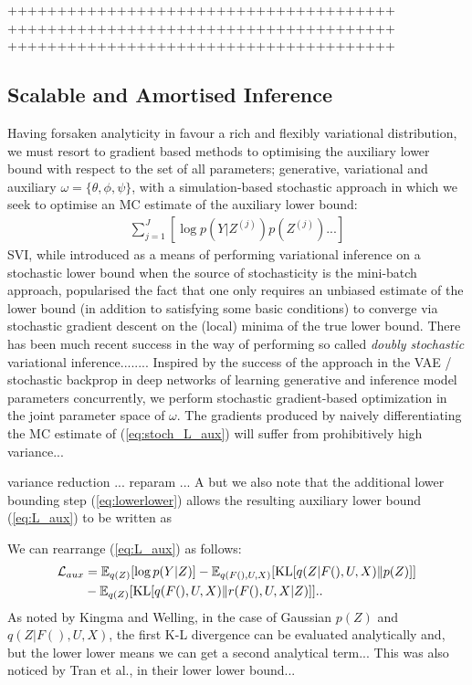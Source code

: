 \documentclass{article}
\begin{document}
+++++++++++++++++++++++++++++++++++++++
+++++++++++++++++++++++++++++++++++++++
+++++++++++++++++++++++++++++++++++++++

\subsection{Scalable and Amortised Inference}
\label{subsec:scale}

Having forsaken analyticity in favour a rich and flexibly variational distribution, we must resort to gradient based methods to optimising the auxiliary lower bound with respect to the set of all parameters; generative, variational and auxiliary $\omega=\{\theta,\phi,\psi\}$, with a simulation-based stochastic approach in which we seek to optimise an MC estimate of the auxiliary lower bound:
%
\begin{align}
  \sum_{j=1}^J [\log p(Y|Z^{(j)})p(Z^{(j)})...]\label{eq:stoch_L_aux}
\end{align}
%
SVI, while introduced as a means of performing variational inference on a stochastic lower bound when the source of stochasticity is the mini-batch approach, popularised the fact that one only requires an unbiased estimate of the lower bound (in addition to satisfying some basic conditions) to converge via stochastic gradient descent on the (local) minima of the true lower bound. There has been much recent success in the way of performing so called \emph{doubly stochastic} variational inference........
Inspired by the success of the approach in the VAE / stochastic backprop in deep networks of learning generative and inference model parameters concurrently, we perform stochastic gradient-based optimization in the joint parameter space of $\omega$. The gradients produced by naively differentiating the MC estimate of (\ref{eq:stoch_L_aux}) will suffer from prohibitively high variance...

variance reduction ... reparam ... A but we also note that the additional lower bounding step (\ref{eq:lowerlower}) allows the resulting auxiliary lower bound (\ref{eq:L_aux}) to be written as

We can rearrange (\ref{eq:L_aux}) as follows:
%
\begin{align}
  \mathcal{L}_{aux} &= \mathbb{E}_{q(Z)}[ \log p(Y|Z) ] - \mathbb{E}_{q(F(),U,X)}[ \text{KL}[q(Z|F(),U,X)\Vert p(Z)] ]\notag\\
  &- \mathbb{E}_{q(Z)}[ \text{KL}[q(F(),U,X)\Vert r(F(),U,X|Z)] ].\label{eq:L_aux_ABC}.
\end{align}
%
As noted by Kingma and Welling, in the case of Gaussian $p(Z)$ and $q(Z|F(),U,X)$, the first K-L divergence can be evaluated analytically and, but the lower lower means we can get a second analytical term... This was also noticed by Tran et al., in their lower lower bound...
\end{document}
